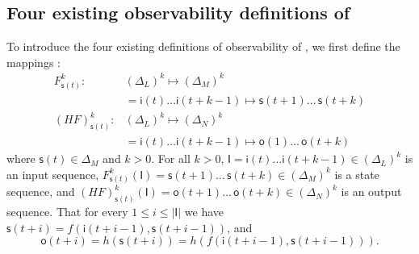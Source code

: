 %  

\subsection{Four existing observability definitions of \BCNs}
To introduce the four existing definitions of observability of \BCNs, we first define the mappings \cite{Zhang2016Observability}:
\begin{equation}
\begin{split}
F^k_{\mathsf{s}(t)}:& (\Delta_L)^k\mapsto(\Delta_M)^k\\
&=\mathsf{i}(t)\ldots \mathsf{i}({t+k-1}) \mapsto \mathsf{s}(t+1) \ldots\, \mathsf{s}(t+k)\\
(HF)^k_{\mathsf{s}(t)} :& (\Delta_L)^k\mapsto(\Delta_N)^k\\
 &=\mathsf{i}(t)\ldots \mathsf{i}(t+k-1) \mapsto \mathsf{o}(1)\ldots\, \mathsf{o}(t+k)
\end{split}
\label{equ:6}
\end{equation}
where $\mathsf{s}(t)\in \Delta_M$ and $k>0$. For all  $k>0$,
$\mathsf{I}=\mathsf{i}(t)\ldots \mathsf{i}({t+k-1}) \in(\Delta_L)^k$
is an input sequence, 
$F^k_{\mathsf{s}(t)}(\mathsf{I})=\mathsf{s}(t+1) \ldots\, \mathsf{s}(t+k) \in(\Delta_M)^k$
 is a state sequence, and 
 $(HF)^k_{\mathsf{s}(t)}(\mathsf{I})=\mathsf{o}(t+1)\ldots\, \mathsf{o}(t+k) \in(\Delta_N)^k$
 is an output sequence. That for every $1\le i \le |\mathsf{I}|$ we have 
 $\mathsf{s}(t+i)=f(\mathsf{i}(t+i-1),\mathsf{s}(t+i-1))$,
and 
 \[\mathsf{o}(t+i)=h(\mathsf{s}(t+i))=h(f(\mathsf{i}(t+i-1),\mathsf{s}(t+i-1))).\] 


